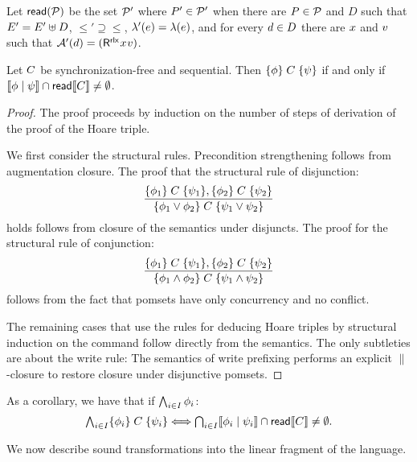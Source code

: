 Let ${\mathsf{read}}(\mathcal{P})$ be the set $\mathcal{P}'$ where $P'\in\mathcal{P}'$ when there are
$P\in\mathcal{P}$ and $D$ such that $E'= E'\uplus D$,
${\le'} \supseteq{\le}$, $\lambda'(e) = \lambda(e)$, and for every
$d\in D$ there are $x$ and $v$ such that
$\labelingAct'(\bEv)=(\DR[\modeRLX]{\aLoc}{\aVal})$.

\begin{theorem}
  Let $C$ be synchronization-free and sequential.  Then
  $\{\phi\}\allowbreak\;C\;\allowbreak\{\psi\}$ if and only if
  $\llbracket\phi\mid\psi\rrbracket\cap\mathsf{read}\llbracket C\rrbracket\neq\emptyset$.
\begin{proof}
  The proof proceeds by induction on the number of steps of derivation of the
  proof of the Hoare triple.

  We first consider the structural rules.  Precondition strengthening follows
  from augmentation closure.  The proof that the structural rule of
  disjunction:
  \begin{displaymath}
    \frac{\{\phi_1\}\allowbreak\;C\;\allowbreak\{\psi_1\},  \{\phi_2\}\allowbreak\;C\;\allowbreak\{\psi_2\}}{ \{\phi_1 \lor \phi_2\}\allowbreak\;C\;\allowbreak\{\psi_1\lor \psi_2\}} 
  \end{displaymath}
  holds  follows from closure of the semantics under disjuncts. The proof for the structural rule of conjunction:
  \begin{displaymath}
    \frac{\{\phi_1\}\allowbreak\;C\;\allowbreak\{\psi_1\},  \{\phi_2\}\allowbreak\;C\;\allowbreak\{\psi_2\}}{ \{\phi_1 \land \phi_2\}\allowbreak\;C\;\allowbreak\{\psi_1\land \psi_2\}} 
  \end{displaymath}
  follows from the fact that pomsets have only concurrency and no conflict.  

  The remaining cases that use the rules for deducing Hoare triples by
  structural induction on the command follow directly from the semantics.
  The only subtleties are about the write rule: The semantics of write
  prefixing performs an explicit $\parallel$-closure to restore closure under
  disjunctive pomsets.
\end{proof}
\end{theorem}
As a corollary, we have that if $\bigwedge_{i\in I}\phi_i$:
\begin{displaymath}
  \textstyle\bigwedge_{i\in I}\{\phi_i\}\allowbreak\;C\;\allowbreak\{\psi_i\} \Longleftrightarrow
  \textstyle\bigcap_{i\in I}\llbracket\phi_i\mid\psi_i\rrbracket\cap\mathsf{read}\llbracket C\rrbracket\neq\emptyset.
\end{displaymath}

We now describe sound transformations into the linear fragment of the
language.

